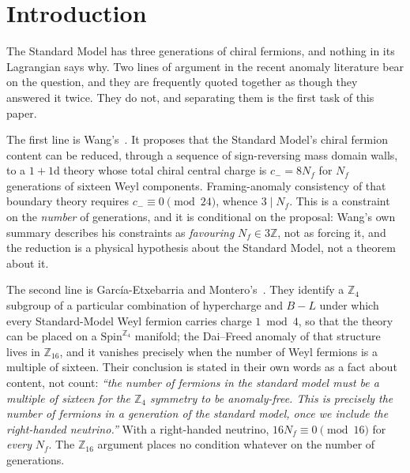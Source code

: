 \documentclass[aps,prd,reprint,nofootinbib,superscriptaddress]{revtex4-2}
\begin{document}
\maketitle

\section{Introduction}
\label{sec:intro}

The Standard Model has three generations of chiral fermions, and nothing
in its Lagrangian says why. Two lines of argument in the recent
anomaly literature bear on the question, and they are frequently quoted
together as though they answered it twice. They do not, and separating
them is the first task of this paper.

The first line is Wang's~\cite{Wang2024}. It proposes that the
Standard Model's chiral fermion content can be reduced, through a
sequence of sign-reversing mass domain walls, to a $1{+}1$d theory whose
total chiral central charge is $c_{-} = 8 N_f$ for $N_f$ generations of
sixteen Weyl components. Framing-anomaly consistency of that boundary
theory requires $c_{-} \equiv 0 \pmod{24}$, whence $3 \mid N_f$. This is
a constraint on the \emph{number} of generations, and it is conditional
on the proposal: Wang's own summary describes his constraints as
\emph{favouring} $N_f \in 3\mathbb{Z}$, not as forcing it, and the
reduction is a physical hypothesis about the Standard Model, not a
theorem about it.

The second line is Garc\'ia-Etxebarria and Montero's~\cite{GarciaEtxebarria2019}.
They identify a $\mathbb{Z}_4$ subgroup of a particular combination of
hypercharge and $B-L$ under which every Standard-Model Weyl fermion
carries charge $1 \bmod 4$, so that the theory can be placed on a
$\mathrm{Spin}^{\mathbb{Z}_4}$ manifold; the Dai--Freed anomaly of that
structure lives in $\mathbb{Z}_{16}$, and it vanishes precisely when the
number of Weyl fermions is a multiple of sixteen. Their conclusion is
stated in their own words as a fact about content, not count:
\emph{``the number of fermions in the standard model must be a multiple
of sixteen for the $\mathbb{Z}_4$ symmetry to be anomaly-free. This is
precisely the number of fermions in a generation of the standard model,
once we include the right-handed neutrino.''} With a right-handed
neutrino, $16 N_f \equiv 0 \pmod{16}$ for \emph{every} $N_f$. The
$\mathbb{Z}_{16}$ argument places no condition whatever on the number of
generations.
\end{document}

